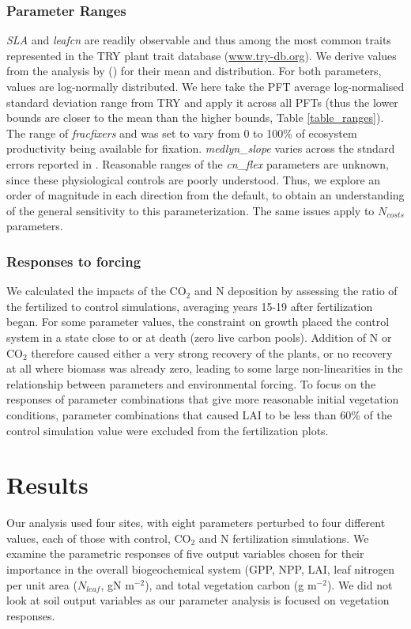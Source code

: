 \usepackage{}\documentclass[draft,linenumbers]{agujournal}
\begin{document}
\subsubsection{Parameter Ranges}
\emph{SLA} and \emph{leafcn} are readily observable and thus among the most common traits represented in the TRY plant trait database (\url{www.try-db.org}). We derive values from the analysis by (\cite{kattge2011}) for their mean and distribution. For both parameters, values are log-normally distributed. We here take the PFT average log-normalised standard deviation range from TRY and apply it across all PFTs (thus the lower bounds are closer to the mean than the higher bounds, Table \ref{table_ranges}). The range of \emph{fracfixers} and was set to vary from 0 to 100\% of ecosystem productivity being available for fixation.  \emph{medlyn\_slope} varies across the stndard errors reported in \cite{dekauwe2015}. Reasonable ranges of the \emph{cn\_flex} parameters are unknown, since these physiological controls are poorly understood. Thus, we explore an order of magnitude in each direction from the default, to obtain an understanding of the general sensitivity to this parameterization. The same issues apply to $N_{costs}$ parameters. 

\subsubsection{Responses to forcing}
We calculated the impacts of the CO$_{2}$ and N deposition by assessing the ratio of the fertilized to control simulations, averaging years 15-19 after fertilization began. For some parameter values, the constraint on growth placed the control system in a state close to or at death (zero live carbon pools). Addition of N or CO$_{2}$ therefore caused either a very strong recovery of the plants, or no recovery at all where biomass was already zero, leading to some large non-linearities in the relationship between parameters and environmental forcing. To focus on the responses of parameter combinations that give more reasonable initial vegetation conditions, parameter combinations that caused LAI to be less than 60\% of the control simulation value were excluded from the fertilization plots.

\section{Results}
Our analysis used four sites, with eight parameters perturbed to four different values, each of those with control, CO$_{2}$ and N fertilization simulations.  We examine the parametric responses of five output variables chosen for their importance in the overall biogeochemical system (GPP, NPP, LAI, leaf nitrogen per unit area ($N_{leaf}$, gN m$^{-2}$), and total vegetation carbon (g m$^{-2}$). We did not look at soil output variables as our parameter analysis is focused on vegetation responses. 
\end{document}
